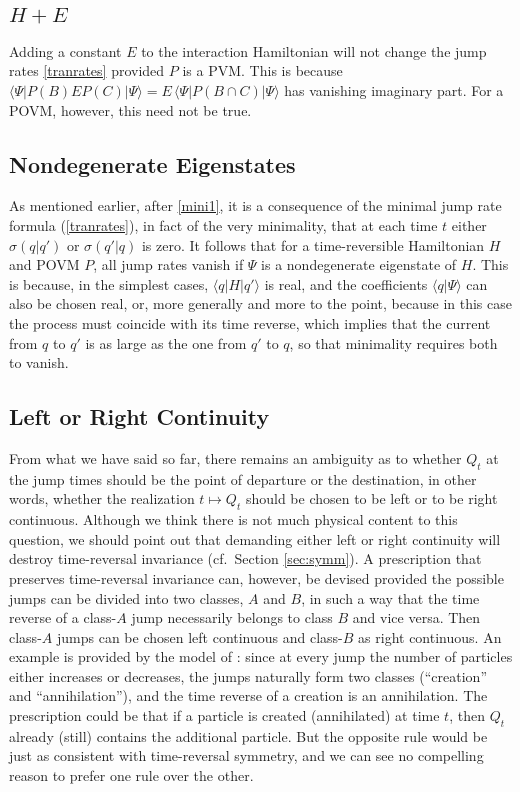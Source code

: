 \documentclass[12pt]{article}
\newcommand{\1}{\mathbf{1}} %
\renewcommand{\sp}[2]{\langle #1 | #2 \rangle} %
\newcommand{\pov}{{P}}%
\begin{document}
\subsection{$H+E$}

   Adding a constant $E$ to the interaction Hamiltonian will not
   change the jump rates \eqref{tranrates} provided $\pov$ is a PVM.
   This is because $\sp{\Psi}{\pov(B) E \pov(C) |\Psi} = E \,
   \sp{\Psi}{\pov(B \cap C) |\Psi}$ has vanishing imaginary part.  For
   a POVM, however, this need not be true.


\subsection{Nondegenerate Eigenstates}

   As mentioned earlier, after
   \eqref{mini1}, it is a consequence of the minimal jump rate formula
   (\ref{tranrates}), in fact of the very minimality, that at each time
   $t$ either $\sigma(q|q')$ or $\sigma(q'|q)$ is zero. It follows that
   for a time-reversible Hamiltonian $H$ and POVM $\pov$, all jump
   rates vanish if $\Psi$ is a nondegenerate eigenstate of $H$.  This
   is because, in the simplest cases, $\sp{q}{H|q'}$ is real, and the
   coefficients $\sp{q}{\Psi}$ can also be chosen real, or, more
   generally and more to the point, because in this case the process
   must coincide with its time reverse, which implies that the current
   from $q$ to $q'$ is as large as the one from $q'$ to $q$, so that
   minimality requires both to vanish.


\subsection{Left or Right Continuity}

   {}From what we have said so far, there
   remains an ambiguity as to whether $Q_t$ at the jump times should be
   the point of departure or the destination, in other words, whether
   the realization $t\mapsto Q_t$ should be chosen to be left or to be
   right continuous. Although we think there is not much physical
   content to this question, we should point out that demanding either
   left or right continuity will destroy time-reversal invariance (cf.\
   Section \ref{sec:symm}).  A prescription that preserves
   time-reversal invariance can, however, be devised provided the
   possible jumps can be divided into two classes, $A$ and $B$, in such
   a way that the time reverse of a class-$A$ jump necessarily belongs
   to class $B$ and vice versa. Then class-$A$ jumps can be chosen left
   continuous and class-$B$ as right continuous. An example is provided
   by the model of \cite{crea1}: since at every jump the number of
   particles either increases or decreases, the jumps naturally form
   two classes (``creation'' and ``annihilation''), and the time
   reverse of a creation is an annihilation. The prescription could be
   that if a particle is created (annihilated) at time $t$, then $Q_t$
   already (still) contains the additional particle. But the opposite
   rule would be just as consistent with time-reversal symmetry, and we
   can see no compelling reason to prefer one rule over the other.
\end{document}
